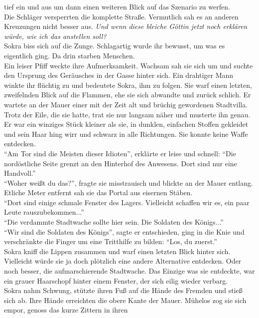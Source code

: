 tief ein und aus um dann einen weiteren Blick auf das Szenario zu werfen.\\
Die Schläger versperrten die komplette Straße. Vermutlich sah es an anderen Kreuzungen nicht besser 
aus. \textit{Und wenn diese bleiche Göttin jetzt noch erklären würde, wie ich das anstellen soll?}\\
Sokra biss sich auf die Zunge. Schlagartig wurde ihr bewusst, um was es eigentlich ging. Da drin 
starben Menschen.\\
Ein leiser Pfiff weckte ihre Aufmerksamkeit. Wachsam sah sie sich um und suchte den Ursprung des 
Geräusches in der Gasse hinter sich. Ein drahtiger Mann winkte ihr flüchtig zu und bedeutete Sokra, 
ihm zu folgen. Sie warf einen letzten, zweifelnden Blick auf die Flammen, ehe sie sich abwandte und 
zurück schlich. Er wartete an der Mauer einer mit der Zeit alt und brüchig gewordenen Stadtvilla. 
Trotz der Eile, die sie hatte, trat sie nur langsam näher und musterte ihn genau. Er war ein 
winziges Stück kleiner als sie, in dunklen, einfachen Stoffen gekleidet und sein Haar hing wirr und 
schwarz in alle Richtungen. Sie konnte keine Waffe entdecken.\\
``Am Tor sind die Meisten dieser Idioten'', erklärte er leise und schnell: ``Die nordöstliche Seite 
grenzt an den Hinterhof des Anwesens. Dort sind nur eine Handvoll.''\\
``Woher weißt du das?'', fragte sie misstrauisch und blickte an der Mauer entlang. Etliche Meter 
entfernt sah sie das Portal aus eisernen Stäben.\\
``Dort sind einige schmale Fenster des Lagers. Vielleicht schaffen wir es, ein paar Leute 
rauszubekommen...''\\
``Die verdammte Stadtwache sollte hier sein. Die Soldaten des Königs...''\\
``Wir sind die Soldaten des Königs'', sagte er entschieden, ging in die Knie und verschränkte die 
Finger um eine Tritthilfe zu bilden: ``Los, du zuerst.''\\
Sokra kniff die Lippen zusammen und warf einen letzten Blick hinter sich. Vielleicht würde sie ja 
doch plötzlich eine andere Alternative entdecken. Oder noch besser, die aufmarschierende 
Stadtwache. Das Einzige was sie entdeckte, war ein grauer Haarschopf hinter einem Fenster, der sich 
eilig wieder verbarg.\\
Sokra nahm Schwung, stützte ihren Fuß auf die Hände des Fremden und stieß sich ab. Ihre Hände 
erreichten die obere Kante der Mauer. Mühelos zog sie sich empor, genoss das kurze Zittern in ihren 
